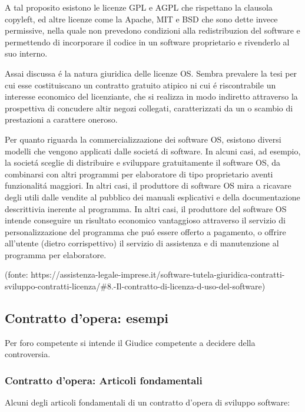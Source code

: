 \documentclass{article}
\begin{document}
A tal proposito esistono le licenze GPL e AGPL che rispettano la clausola copyleft, ed altre licenze come la Apache, MIT e BSD che sono dette invece permissive, nella quale non prevedono condizioni alla redistribuzion del software e permettendo di incorporare il codice in un software proprietario e rivenderlo al suo interno. 

Assai discussa \'e la natura giuridica delle licenze OS. Sembra prevalere la tesi per cui esse costituiscano un contratto gratuito atipico ni cui \'e riscontrabile un interesse economico del licenziante, che si realizza in modo indiretto attraverso la prospettiva di concudere altir negozi collegati, caratterizzati da un o scambio di prestazioni a carattere oneroso. 

Per quanto riguarda la commercializzazione dei software OS, esistono diversi modelli che vengono applicati dalle societ\'a di software. In alcuni casi, ad esempio, la societ\'a sceglie di distribuire e sviluppare gratuitamente il software OS, da combinarsi con altri programmi per elaboratore di tipo proprietario aventi funzionalit\'a maggiori. In altri casi, il produttore di software OS mira a ricavare degli utili dalle vendite al pubblico dei manuali esplicativi e della documentazione descrittivia inerente al programma. In altri casi, il produttore del software OS intende conseguire un risultato economico vantaggioso attraverso il servizio di personalizzazione del programma che pu\'o essere offerto a pagamento, o offrire all'utente (dietro corrispettivo) il servizio di assistenza e di manutenzione al programma per elaboratore. 

(fonte: https://assistenza-legale-imprese.it/software-tutela-giuridica-contratti-sviluppo-contratti-licenza/\#8.-Il-contratto-di-licenza-d-uso-del-software)

\subsection{Contratto d'opera: esempi}
Per foro competente si intende il Giudice competente a decidere della controversia. 

\subsubsection{Contratto d'opera: Articoli fondamentali}
Alcuni degli articoli fondamentali di un contratto d'opera di sviluppo software:
\end{document}
